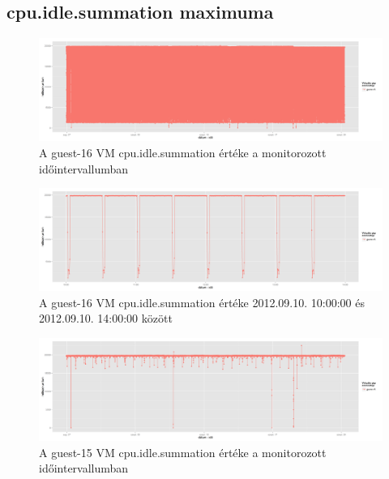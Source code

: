 \documentclass[a4paper,10pt,titlepage]{article}
\begin{document}
\subsection{cpu.idle.summation maximuma}

\begin{figure}[h!]
\centering
\includegraphics[width=1.00\textwidth]{figures/cpu_idle_summation-guest-16-20120826230140-20120924083120.png}
\caption{A guest-16 VM cpu.idle.summation értéke a monitorozott időintervallumban \label{fig:cpu_idle_summation_g16_1}}
\end{figure}

\begin{figure}[h!]
\centering
\includegraphics[width=1.00\textwidth]{figures/cpu_idle_summation-guest-16-20120910100000-20120910140000.png}
\caption{A guest-16 VM cpu.idle.summation értéke 2012.09.10. 10:00:00 és 2012.09.10. 14:00:00 között \label{fig:cpu_idle_summation_g16_2}}
\end{figure}

\begin{figure}[h!]
\centering
\includegraphics[width=1.00\textwidth]{figures/cpu_idle_summation-guest-15-20120826230140-20120924083120.png}
\caption{A guest-15 VM cpu.idle.summation értéke a monitorozott időintervallumban \label{fig:cpu_idle_summation_g15_1}}
\end{figure}
\end{document}
